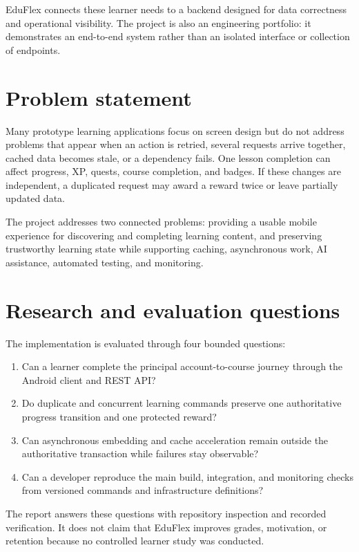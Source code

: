 \documentclass[12pt,a4paper,oneside]{report}
\begin{document}
EduFlex connects these learner needs to a backend designed for data correctness and
operational visibility. The project is also an engineering portfolio: it demonstrates
an end-to-end system rather than an isolated interface or collection of endpoints.

\section{Problem statement}
Many prototype learning applications focus on screen design but do not address
problems that appear when an action is retried, several requests arrive together,
cached data becomes stale, or a dependency fails. One lesson completion can affect
progress, XP, quests, course completion, and badges. If these changes are independent,
a duplicated request may award a reward twice or leave partially updated data.

The project addresses two connected problems: providing a usable mobile experience
for discovering and completing learning content, and preserving trustworthy learning
state while supporting caching, asynchronous work, AI assistance, automated testing,
and monitoring.

\section{Research and evaluation questions}
The implementation is evaluated through four bounded questions:
\begin{enumerate}[leftmargin=*]
\item Can a learner complete the principal account-to-course journey through the
Android client and REST API?
\item Do duplicate and concurrent learning commands preserve one authoritative
progress transition and one protected reward?
\item Can asynchronous embedding and cache acceleration remain outside the
authoritative transaction while failures stay observable?
\item Can a developer reproduce the main build, integration, and monitoring checks
from versioned commands and infrastructure definitions?
\end{enumerate}
The report answers these questions with repository inspection and recorded verification.
It does not claim that EduFlex improves grades, motivation, or retention because no
controlled learner study was conducted.
\end{document}
